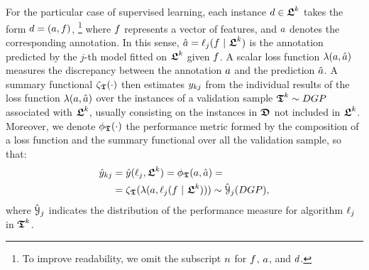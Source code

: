 For the particular case of supervised learning,
each instance $d \in \boldsymbol{\mathfrak{L}}^{k}$
takes the form $d = (a, f)$,%
\footnote{%
  To improve readability, we omit the subscript 
  $n$ for $f$, $a$, and $d$.
}
where $f$ represents a vector of features,
and $a$ denotes the corresponding annotation.
%
In this sense, $\hat{a} = \ell_{j}(f~|~\boldsymbol{\mathfrak{L}}^{k})$
is the annotation predicted by the $j$-th model fitted on 
$\boldsymbol{\mathfrak{L}}^k$ given $f$.
%
A scalar loss function $\lambda(a, \hat{a})$
measures the discrepancy between the annotation $a$ and the
prediction $\hat{a}$.
%
A summary functional $\zeta_{\boldsymbol{\mathfrak{T}}}(\cdot)$ then estimates
$y_{kj}$ from the individual results
of the loss function $\lambda(a, \hat{a})$ over the instances
of a validation sample $\boldsymbol{\mathfrak{T}}^{k} \sim DGP$ 
associated with $\boldsymbol{\mathfrak{L}}^{k}$,
usually consisting on the instances in $\boldsymbol{\mathfrak{D}}$ not included
in $\boldsymbol{\mathfrak{L}}^{k}$.
%
Moreover, 
we denote $\phi_{\boldsymbol{\mathfrak{T}}}(\cdot)$ the performance metric formed
by the composition of a loss function and the summary functional over
all the validation sample, so that:
%
\begin{align}
\begin{split}
  \hat{y}_{kj} &{}=
  \hat{y}(\ell_j, \boldsymbol{\mathfrak{L}}^{k}) =
  \phi_{\boldsymbol{\mathfrak{T}}}(a, \hat{a}) = \\
  &{}= \zeta_{\boldsymbol{\mathfrak{T}}}(\lambda(a, \ell_{j}
    (f~|~\boldsymbol{\mathfrak{L}}^{k}))) 
  \sim \hat{\mathcal{Y}}_{j}(DGP),
  \end{split}
\end{align}
%
where $\hat{\mathcal{Y}}_{j}$ indicates the distribution of the
performance measure for algorithm $\ell_{j}$ in $\boldsymbol{\mathfrak{T}}^{k}$.


%

